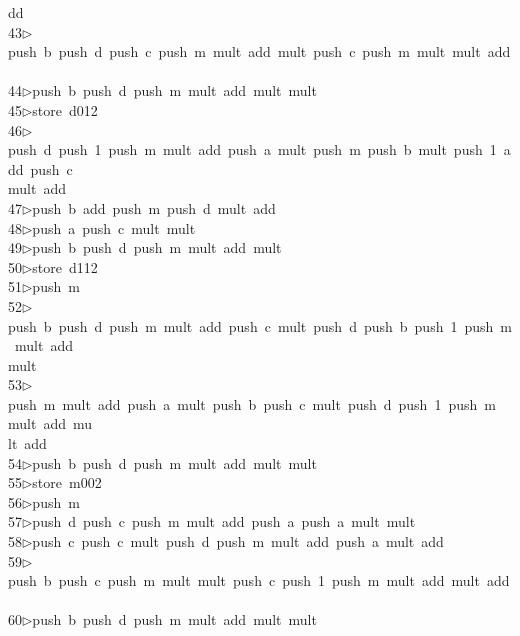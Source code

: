 \begin{tabbing}
\>dd\ \\[0pt]
43\>$\triangleright$\>push\ b\ push\ d\ push\ c\ push\ m\ mult\ add\ mult\ push\ c\ push\ m\ mult\ mult\ add\ \\[0pt]
44\>$\triangleright$\>push\ b\ push\ d\ push\ m\ mult\ add\ mult\ mult\ \\[0pt]
45\>$\triangleright$\>store\ d012\ \\[0pt]
46\>$\triangleright$\>push\ d\ push\ 1\ push\ m\ mult\ add\ push\ a\ mult\ push\ m\ push\ b\ mult\ push\ 1\ add\ push\ c\ \\[0pt]
\>mult\ add\ \\[0pt]
47\>$\triangleright$\>push\ b\ add\ push\ m\ push\ d\ mult\ add\ \\[0pt]
48\>$\triangleright$\>push\ a\ push\ c\ mult\ mult\ \\[0pt]
49\>$\triangleright$\>push\ b\ push\ d\ push\ m\ mult\ add\ mult\ \\[0pt]
50\>$\triangleright$\>store\ d112\ \\[0pt]
51\>$\triangleright$\>push\ m\ \\[0pt]
52\>$\triangleright$\>push\ b\ push\ d\ push\ m\ mult\ add\ push\ c\ mult\ push\ d\ push\ b\ push\ 1\ push\ m\ mult\ add\ \\[0pt]
\>mult\ \\[0pt]
53\>$\triangleright$\>push\ m\ mult\ add\ push\ a\ mult\ push\ b\ push\ c\ mult\ push\ d\ push\ 1\ push\ m\ mult\ add\ mu\\[0pt]
\>lt\ add\ \\[0pt]
54\>$\triangleright$\>push\ b\ push\ d\ push\ m\ mult\ add\ mult\ mult\ \\[0pt]
55\>$\triangleright$\>store\ m002\ \\[0pt]
56\>$\triangleright$\>push\ m\ \\[0pt]
57\>$\triangleright$\>push\ d\ push\ c\ push\ m\ mult\ add\ push\ a\ push\ a\ mult\ mult\ \\[0pt]
58\>$\triangleright$\>push\ c\ push\ c\ mult\ push\ d\ push\ m\ mult\ add\ push\ a\ mult\ add\ \\[0pt]
59\>$\triangleright$\>push\ b\ push\ c\ push\ m\ mult\ mult\ push\ c\ push\ 1\ push\ m\ mult\ add\ mult\ add\ \\[0pt]
60\>$\triangleright$\>push\ b\ push\ d\ push\ m\ mult\ add\ mult\ mult\ \\[0pt]

\end{tabbing}
